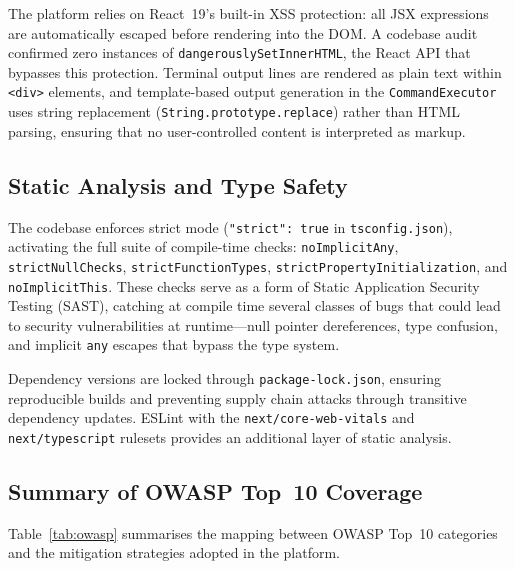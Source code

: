The platform relies on React~19's built-in XSS protection: all JSX expressions are automatically escaped before rendering into the DOM. A codebase audit confirmed zero instances of \texttt{dangerouslySetInnerHTML}, the React API that bypasses this protection. Terminal output lines are rendered as plain text within \texttt{<div>} elements, and template-based output generation in the \texttt{CommandExecutor} uses string replacement (\texttt{String.prototype.replace}) rather than HTML parsing, ensuring that no user-controlled content is interpreted as markup.

\subsection{Static Analysis and Type Safety}\label{subsec:sec-sast}

The codebase enforces \typescript{} strict mode (\texttt{"strict": true} in \texttt{tsconfig.json}), activating the full suite of compile-time checks: \texttt{noImplicitAny}, \texttt{strictNullChecks}, \texttt{strictFunctionTypes}, \texttt{strictPropertyInitialization}, and \texttt{noImplicitThis}. These checks serve as a form of Static Application Security Testing (SAST), catching at compile time several classes of bugs that could lead to security vulnerabilities at runtime---null pointer dereferences, type confusion, and implicit \texttt{any} escapes that bypass the type system.

Dependency versions are locked through \texttt{package-lock.json}, ensuring reproducible builds and preventing supply chain attacks through transitive dependency updates. ESLint with the \texttt{next/core-web-vitals} and \texttt{next/typescript} rulesets provides an additional layer of static analysis.

\subsection{Summary of OWASP Top~10 Coverage}\label{subsec:sec-summary}

Table~\ref{tab:owasp} summarises the mapping between OWASP Top~10 categories and the mitigation strategies adopted in the platform.

